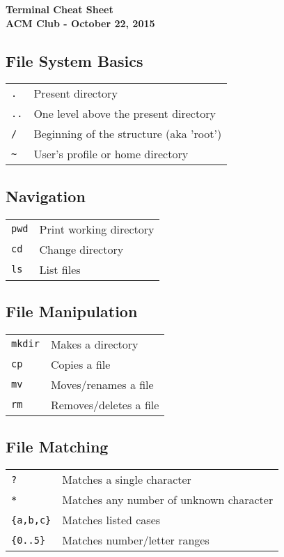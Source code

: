 \documentclass[14pt,landscape]{extarticle}
\begin{document}
\begin{center}
     \Large\textbf{Terminal Cheat Sheet}\\
	\footnotesize\textbf{ACM Club - October 22, 2015}
\end{center}

\raggedright
\footnotesize

\setlength{\multicolsep}{30pt}
\setlength{\columnsep}{0pt}

\begin{multicols}{2}

\subsection{File System Basics}
\begin{tabular}{@{}ll@{}}
\verb!.!    & Present directory \\
\verb!..!  & One level above the present directory \\
\verb!/! & Beginning of the structure (aka 'root') \\
\verb!~!  & User's profile or home directory
\end{tabular}

\subsection{Navigation}
\begin{tabular}{@{}ll@{}}
\verb!pwd!    & Print working directory \\
\verb!cd!  & Change directory \\
\verb!ls! & List files
\end{tabular}

\subsection{File Manipulation}
\begin{tabular}{@{}ll@{}}
\verb!mkdir!    & Makes a directory \\
\verb!cp!  & Copies a file \\
\verb!mv! & Moves/renames a file\\
\verb!rm! & Removes/deletes a file
\end{tabular}

\subsection{File Matching}
\begin{tabular}{@{}ll@{}}
\verb!?!    & Matches a single character \\
\verb!*!  & Matches any number of unknown character \\
\verb!{a,b,c}! & Matches listed cases\\
\verb!{0..5}! & Matches number/letter ranges
\end{tabular}


\end{multicols}
\end{document}
